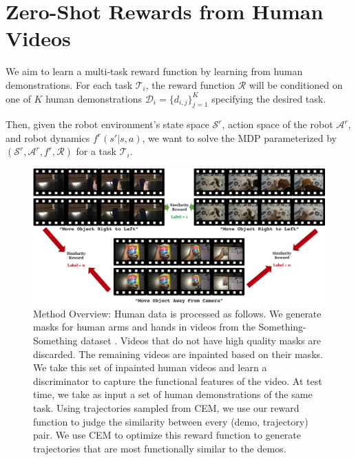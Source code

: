 \section{Zero-Shot Rewards from Human Videos}
\label{sec:method_reward}

We aim to learn a multi-task reward function by learning from human demonstrations. For each task $\mathcal{T}_i$, the reward function $\mathcal{R}$ will be conditioned on one of $K$ human demonstrations $\mathcal{D}_i = \{ d_{i,j} \}_{j=1}^K$ specifying the desired task. 

Then, given the robot environment's state space $\mathcal{S}^r$, action space of the robot $\mathcal{A}^r$, and robot dynamics $f^r(s' | s, a)$, we want to solve the MDP parameterized by $(\mathcal{S}^r, \mathcal{A}^r, f^r, \mathcal{R})$ for a task $\mathcal{T}_i$.

\begin{figure}[H]
\centering
\includegraphics[width=\linewidth]{figs_reward/method_overview.pdf}
\vspace{-0.2in}
   \caption{\small Method Overview: Human data is processed as follows. We generate masks for human arms and hands in videos from the Something-Something dataset \cite{smthsmth}. Videos that do not have high quality masks are discarded. The remaining videos are inpainted based on their masks. We take this set of inpainted human videos and learn a discriminator to capture the functional features of the video. At test time, we take as input a set of human demonstrations of the same task. Using trajectories sampled from CEM, we use our reward function to judge the similarity between every (demo, trajectory) pair. We use CEM to optimize this reward function to generate trajectories that are most functionally similar to the demos.}
    \label{fig:method_reward}
    \vspace{-0.15in}
\end{figure}

